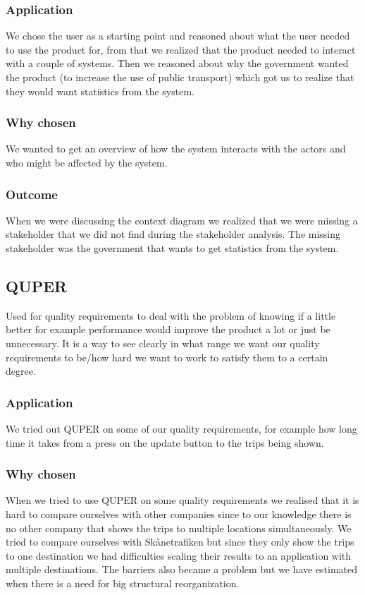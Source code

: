 \documentclass[a4paper]{article}
\begin{document}
			\subsubsection{Application}
			We chose the user as a starting point and reasoned about what the user needed to use the product for, from that we realized that the product needed to interact with a couple of systems. Then we reasoned about why the government wanted the product (to increase the use of public transport) which got us to realize that they would want statistics from the system.
			\subsubsection{Why chosen}
			We wanted to get an overview of how the system interacts with the actors and who might be affected by the system.
			\subsubsection{Outcome}
			When we were discussing the context diagram we realized that we were missing a stakeholder that we did not find during the stakeholder analysis. The missing stakeholder was the government that wants to get statistics from the system. 

		\subsection{QUPER}
		Used for quality requirements to deal with the problem of knowing if a little better for example performance would improve the product a lot or just be unnecessary. It is a way to see clearly in what range we want our quality requirements to be/how hard we want to work to satisfy them to a certain degree.
			\subsubsection{Application}
			We tried out QUPER on some of our quality requirements, for example how long time it takes from a press on the update button to the trips being shown.
			\subsubsection{Why chosen}
			When we tried to use QUPER on some quality requirements we realised that it is hard to compare ourselves with other companies since to our knowledge there is no other company that shows the trips to multiple locations simultaneously. We tried to compare ourselves with Skånetrafiken but since they only show the trips to one destination we had difficulties scaling their results to an application with multiple destinations. The barriers also became a problem but we have estimated when there is a need for big structural reorganization. 
			
\end{document}

